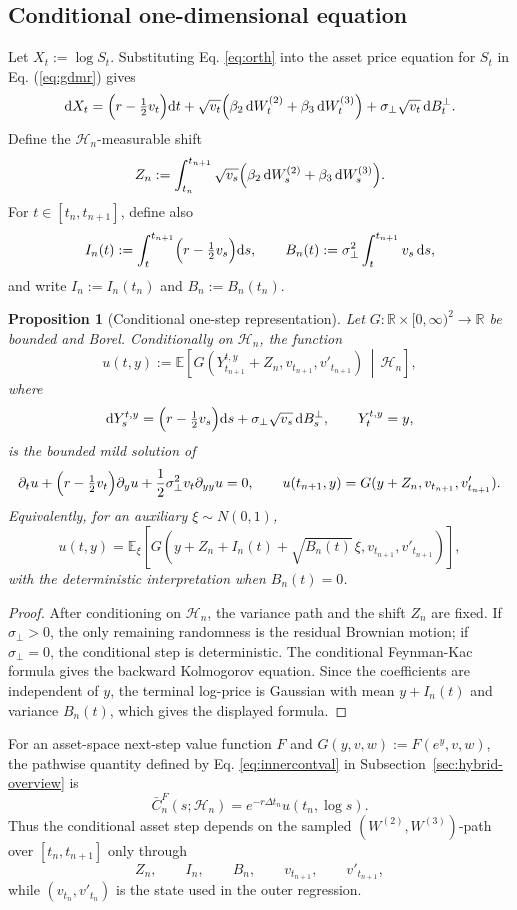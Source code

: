 \documentclass[pdflatex,sn-mathphys-num]{sn-jnl}
\theoremstyle{thmstyleone}%
\newtheorem{proposition}[theorem]{Proposition}
\theoremstyle{thmstylethree}%
\theoremstyle{thmstyletwo}%
\newcommand{\dd}{\mathrm d}
\newcommand{\E}{\mathbb E}
\newcommand{\R}{\mathbb R}
\begin{document}
\subsection{Conditional one-dimensional equation}

Let $X_t:=\log S_t$. Substituting Eq. \eqref{eq:orth} into the asset price equation for $S_t$ in Eq. (\ref{eq:gdmr}) gives
$$
\dd X_t
=\Bigl(r-\tfrac12v_t\Bigr)\dd t
+\sqrt{v_t}\Bigl(\beta_2\,\dd W_t^{(2)}
+\beta_3\,\dd W_t^{(3)}\Bigr)
+\sigma_\perp\sqrt{v_t}\,\dd B_t^\perp .
$$
Define the $\mathcal H_n$-measurable shift
$$
Z_n:=
\int_{t_n}^{t_{n+1}}
\sqrt{v_s}\Bigl(\beta_2\,\dd W_s^{(2)}+
\beta_3\,\dd W_s^{(3)}\Bigr).
$$
For $t\in[t_n,t_{n+1}]$, define also
$$
I_n(t):=\int_t^{t_{n+1}}\Bigl(r-\tfrac12v_s\Bigr)\dd s,
\qquad
B_n(t):=\sigma_\perp^2\int_t^{t_{n+1}}v_s\,\dd s,
$$
and write $I_n:=I_n(t_n)$ and $B_n:=B_n(t_n)$.

\begin{proposition}[Conditional one-step representation]\label{prop:conditional-gaussian-step}
Let $G:\R\times[0,\infty)^2\to\R$ be bounded and Borel. Conditionally on
$\mathcal H_n$, the function
$$
u(t,y)
:=
\E\!\left[
G\!\left(
Y_{t_{n+1}}^{t,y}+Z_n,
v_{t_{n+1}},
v'_{t_{n+1}}
\right)
\,\middle|\,
\mathcal H_n
\right],
$$
where
$$
\dd Y_s^{t,y}
=\Bigl(r-\tfrac12v_s\Bigr)\dd s
+\sigma_\perp\sqrt{v_s}\,\dd B_s^\perp,
\qquad
Y_t^{t,y}=y,
$$
is the bounded mild solution of
$$
\partial_tu+
\Bigl(r-\tfrac12v_t\Bigr)\partial_yu+
\frac12\sigma_\perp^2v_t\partial_{yy}u=0,
\qquad
u(t_{n+1},y)=G(y+Z_n,v_{t_{n+1}},v'_{t_{n+1}}).
$$
Equivalently, for an auxiliary $\xi\sim N(0,1)$,
\begin{equation}\label{eq:gaussian_rep}
u(t,y)
=
\E_\xi\!\left[
G\!\left(
y+Z_n+I_n(t)+\sqrt{B_n(t)}\,\xi,
v_{t_{n+1}},
v'_{t_{n+1}}
\right)
\right],
\end{equation}
with the deterministic interpretation when $B_n(t)=0$.
\end{proposition}

\begin{proof}
After conditioning on $\mathcal H_n$, the variance
path and the shift $Z_n$ are fixed. If $\sigma_\perp>0$, the only remaining
randomness is the residual Brownian motion; if $\sigma_\perp=0$, the
conditional step is deterministic. The conditional
Feynman-Kac formula gives the backward Kolmogorov equation. Since the
coefficients are independent of $y$, the terminal log-price is Gaussian with
mean $y+I_n(t)$ and variance $B_n(t)$, which gives the displayed formula.
\end{proof}
For an asset-space next-step value function $F$ and
$G(y,v,w):=F(e^y,v,w)$, the pathwise quantity defined by Eq. \eqref{eq:innercontval} in
Subsection~\ref{sec:hybrid-overview} is
$$
\bar C_n^F(s;\mathcal H_n)=e^{-r\Delta t_n}u(t_n,\log s).
$$
Thus the conditional asset step depends on the sampled
$(W^{(2)},W^{(3)})$-path over $[t_n,t_{n+1}]$ only through
$$
Z_n,\qquad I_n,\qquad B_n,\qquad v_{t_{n+1}},\qquad v'_{t_{n+1}},
$$
while $(v_{t_n},v'_{t_n})$ is the state used in the outer regression.
\end{document}
